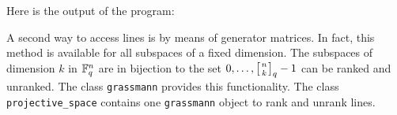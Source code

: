 {\tt

}

Here is the output of the program:


{\tt

}


\bigskip

A second way to access lines is by means of generator matrices. 
In fact, this method is available for all subspaces of a fixed dimension. 
The subspaces of dimension $k$ in ${\mathbb F}_q^n$ are in bijection to the set 
$0, \ldots, \left[{n \atop k}\right]_q - 1$ can be ranked and unranked. 
The class \verb'grassmann' provides this functionality.
The class \verb'projective_space' contains one \verb'grassmann' object to rank and unrank lines.


